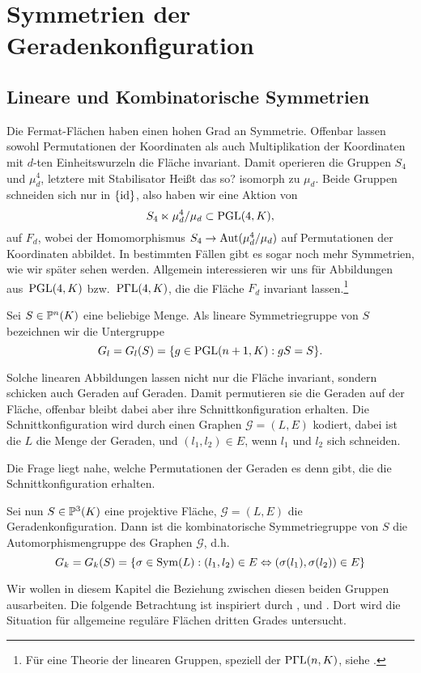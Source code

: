 \chapter{Symmetrien der Geradenkonfiguration} \label{chap:configsymm}
\section{Lineare und Kombinatorische Symmetrien}
Die Fermat-Flächen haben einen hohen Grad an Symmetrie. Offenbar lassen sowohl Permutationen der Koordinaten als auch Multiplikation der Koordinaten mit $d$-ten Einheitswurzeln die Fläche invariant. Damit operieren die Gruppen $S_4$ und $\mu_d^4$, letztere mit Stabilisator \note Heißt das so? isomorph zu $\mu_d$. Beide Gruppen schneiden sich nur in $\{\operatorname{id}\}$, also haben wir eine Aktion von
\begin{equation}
S_4 \ltimes \mu_d^4 / \mu_d \subset \mathrm{PGL}(4,K),
\end{equation}
auf $F_d$, wobei der Homomorphismus $S_4 \rightarrow \operatorname{Aut}(\mu_d^4 / \mu_d)$ auf Permutationen der Koordinaten abbildet. In bestimmten Fällen gibt es sogar noch mehr Symmetrien, wie wir später sehen werden. Allgemein interessieren wir uns für Abbildungen aus~$\mathrm{PGL}(4,K)$ bzw.~$\mathrm{P\Gamma L}(4,K)$, die die Fläche $F_d$ invariant lassen.\footnote{Für eine Theorie der linearen Gruppen, speziell der $\mathrm{P\Gamma L}(n,K)$, siehe \cite{Dieudonne}.}
\begin{defin}
Sei $S \in \mathbb P^{n}(K)$ eine beliebige Menge. Als lineare Symmetriegruppe von $S$ bezeichnen wir die Untergruppe
\begin{equation}
G_l = G_l(S) = \{ g \in \mathrm{PGL}(n+1,K): gS = S \}.
\end{equation}
\end{defin}

Solche linearen Abbildungen lassen nicht nur die Fläche invariant, sondern schicken auch Geraden auf Geraden. Damit permutieren sie die Geraden auf der Fläche, offenbar bleibt dabei aber ihre Schnittkonfiguration erhalten. Die Schnittkonfiguration wird durch einen Graphen $\mathcal G = (L,E)$ kodiert, dabei ist die $L$ die Menge der Geraden, und $(l_1, l_2) \in E$, wenn $l_1$ und $l_2$ sich schneiden.

Die Frage liegt nahe, welche Permutationen der Geraden es denn gibt, die die Schnittkonfiguration erhalten.
\begin{defin}
Sei nun $S \in \mathbb P^{3}(K)$ eine projektive Fläche, $\mathcal G = (L,E)$ die Geradenkonfiguration. Dann ist die kombinatorische Symmetriegruppe von $S$ die Automorphismengruppe des Graphen $\mathcal G$, d.h.
\begin{equation}
G_k = G_k(S) = \{ \sigma \in \operatorname{Sym}(L): (l_1, l_2) \in E \Leftrightarrow (\sigma(l_1), \sigma(l_2)) \in E \}
\end{equation}
\end{defin}
Wir wollen in diesem Kapitel die Beziehung zwischen diesen beiden Gruppen ausarbeiten. Die folgende Betrachtung ist inspiriert durch \cite[Bem.~4.10.1, S.~404]{Hartshorne}, und \cite[Aufg. C--D, S.~180]{Mumford}. Dort wird die Situation für allgemeine reguläre Flächen dritten Grades untersucht.

